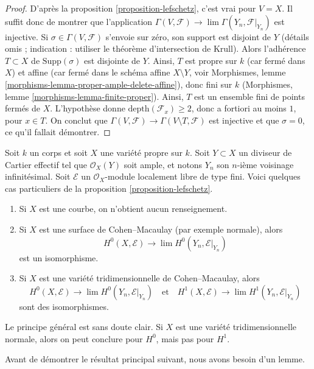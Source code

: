 \begin{proof}
D'après la proposition \ref{proposition-lefschetz}, c'est vrai pour $V = X$.
Il suffit donc de montrer que l'application
$\Gamma(V, \mathcal{F}) \to \lim \Gamma(Y_n, \mathcal{F}|_{Y_n})$
est injective. Si $\sigma \in \Gamma(V, \mathcal{F})$
s'envoie sur zéro, son support est disjoint de $Y$ (détails omis ; indication :
utiliser le théorème d'intersection de Krull). Alors l'adhérence $T \subset X$
de $\text{Supp}(\sigma)$ est disjointe de $Y$.
Ainsi, $T$ est propre sur $k$ (car fermé dans $X$)
et affine (car fermé dans le schéma affine $X \setminus Y$, voir
Morphismes, lemme \ref{morphisms-lemma-proper-ample-delete-affine}),
donc fini sur $k$
(Morphismes, lemme \ref{morphisms-lemma-finite-proper}).
Ainsi, $T$ est un ensemble fini de points fermés de $X$.
L'hypothèse donne $\text{depth}(\mathcal{F}_x) \geq 2$, donc a fortiori au moins $1$,
pour $x \in T$. On conclut que
$\Gamma(V, \mathcal{F}) \to \Gamma(V \setminus T, \mathcal{F})$
est injective et que $\sigma = 0$, ce qu'il fallait démontrer.
\end{proof}


\begin{example}
\label{example-lefschetz}
Soit $k$ un corps et soit $X$ une variété propre sur $k$.
Soit $Y \subset X$ un diviseur de Cartier effectif tel que
$\mathcal{O}_X(Y)$ soit ample, et
notons $Y_n$ son $n$-ième voisinage infinitésimal.
Soit $\mathcal{E}$ un $\mathcal{O}_X$-module localement libre de type fini.
Voici quelques cas particuliers de la proposition \ref{proposition-lefschetz}.
\begin{enumerate}
\item Si $X$ est une courbe, on n'obtient aucun renseignement.
\item Si $X$ est une surface de Cohen--Macaulay (par exemple normale), alors
$$
H^0(X, \mathcal{E}) \to \lim H^0(Y_n, \mathcal{E}|_{Y_n})
$$
est un isomorphisme.
\item Si $X$ est une variété tridimensionnelle de Cohen--Macaulay, alors
$$
H^0(X, \mathcal{E}) \to \lim H^0(Y_n, \mathcal{E}|_{Y_n})
\quad\text{et}\quad
H^1(X, \mathcal{E}) \to \lim H^1(Y_n, \mathcal{E}|_{Y_n})
$$
sont des isomorphismes.
\end{enumerate}
Le principe général est sans doute clair. Si $X$ est une variété tridimensionnelle normale, alors
on peut conclure pour $H^0$, mais pas pour $H^1$.
\end{example}

\noindent
Avant de démontrer le résultat principal suivant, nous avons besoin d'un lemme.

